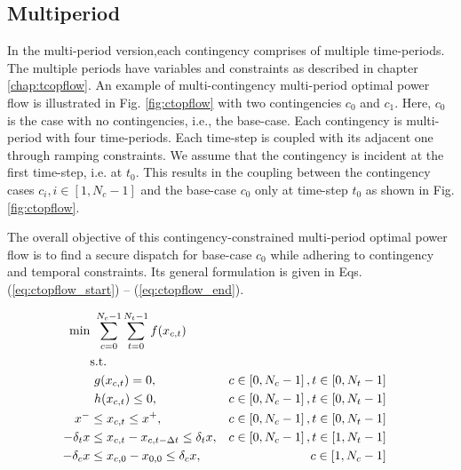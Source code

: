 \subsection{Multiperiod}

In the multi-period version,each contingency comprises of multiple time-periods. The multiple periods have variables and constraints as described in chapter \ref{chap:tcopflow}. An example of multi-contingency multi-period optimal power flow is illustrated in Fig. \ref{fig:ctopflow} with two contingencies $c_0$ and $c_1$. Here, $c_0$ is the case with no contingencies, i.e., the base-case. Each contingency is multi-period with four time-periods. Each time-step is coupled with its adjacent one through ramping constraints. We assume that the contingency is incident at the first time-step, i.e. at $t_0$. This results in the coupling between the contingency cases $c_i, i \in [1,N_c-1]$ and the base-case $c_0$ only at time-step $t_0$ as shown in Fig. \ref{fig:ctopflow}.



The overall objective of this contingency-constrained multi-period optimal power flow is to find a secure dispatch for base-case $c_0$ while adhering to contingency and temporal constraints. Its general formulation is given in Eqs. (\ref{eq:ctopflow_start}) -- (\ref{eq:ctopflow_end}).

\begin{align}
\centering
\text{min}&~\sum_{c=0}^{N_c-1}\sum_{t=0}^{N_t-1}f(x_{c,t})& \label{eq:ctopflow_start}\\
&\text{s.t.}& \nonumber \\
&~g(x_{c,t}) = 0,                                        &c \in \left[0,N_c-1\right], t \in \left[0,N_t-1\right]& \\
&~h(x_{c,t}) \le 0,                                      &c \in \left[0,N_c-1\right], t \in \left[0,N_t-1\right]& \\
x^- & \le x_{c,t} \le x^+,                               &c \in \left[0,N_c-1\right], t\in \left[0,N_t-1\right]& \\
-\delta_t{x} & \le x_{c,t} - x_{c,t-\Delta{t}} \le \delta_t{x},&c \in \left[0,N_c-1\right], t \in \left[1,N_t-1\right]& \label{eq:ctopflow_time_coupling}\\
-\delta_c{x} & \le x_{c,0} - x_{0,0} \le \delta_c{x},&c \in \left[1,N_c-1\right]& \\
\label{eq:ctopflow_end}
\end{align}

